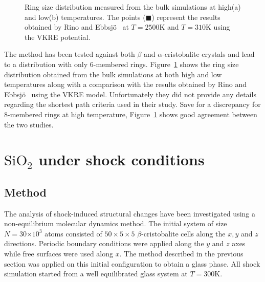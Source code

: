 \documentclass[aps,10pt,twocolumn]{revtex4}
\newcommand{\mrm}[1]{\ensuremath{\mathrm{#1}}\xspace}
\newcommand{\SiOTwo}{\ensuremath{\mrm{SiO_2}}\xspace}
\newlength{\picW}	%
\newcommand{\picA}{270}	%
\newcommand{\picL}[1]{\texttt{[image: \#1]}}
\newcommand{\e}[1]{\ensuremath{\times 10^{#1}}}
\begin{document}
\picW=8cm
\begin{figure}
\subfigure[]{\picL{fig04a.ps}}
\subfigure[]{\picL{fig04b.ps}}
\caption{Ring size distribution measured from the bulk simulations at high(a) and low(b)
temperatures. The points ($\blacksquare$) represent the results obtained by Rino and
Ebbsj\"o~\cite{RinoEbbsjo93} at $T=2500$K and $T=310$K using the VKRE potential.}
\label{fig:mkGlass_SPA}
\end{figure}

The method has been tested against both  $\beta$ and $\alpha$-cristobalite crystals and lead to
a distribution with only 6-membered rings. Figure~\ref{fig:mkGlass_SPA} shows the ring size
distribution obtained from the bulk simulations at both high and low temperatures along with a
comparison with the results obtained by Rino and Ebbsj\"o~\cite{RinoEbbsjo93} using the VKRE
model. Unfortunately they did not provide any details regarding the shortest path criteria used
in their study. Save for a discrepancy for 8-membered rings at high temperature,
Figure~\ref{fig:mkGlass_SPA} shows good agreement between the two studies.




\section{\SiOTwo under shock conditions}
\label{s:shock}

\subsection{Method}


The analysis of shock-induced structural changes have been investigated using a non-equilibrium
molecular dynamics method. The initial system of size $N=30\e{3}$ atoms consisted of
$50\times5\times5$
$\beta$-cristobalite cells along the $x,y$ and $z$ directions.  Periodic boundary conditions were
applied along the $y$ and $z$ axes while free surfaces were used along $x$. The
method described in the previous section was applied on this initial configuration to obtain a
glass phase. All shock simulation started from a well equilibrated glass system at $T=300$K.\\
\end{document}

